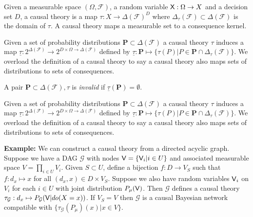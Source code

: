 \begin{definition}\label{def:gen_causal_theory}
Given a measurable space $(\Omega,\mathcal{F})$, a random variable $\mathsf{X}:\Omega\to X$ and a decision set $D$, a causal theory is a map $\tau:X \to \Delta(\mathcal{F})^D$ where $\Delta_{\tau}(\mathcal{F})\subset \Delta(\mathcal{F})$ is the domain of $\tau$. A causal theory maps a measurable set to a consequence kernel.

Given a set of probability distributions $\mathbf{P}\subset \Delta(\mathcal{F})$ a causal theory $\tau$ induces a map $\underline{\tau}:2^{\Delta(\mathcal{F})}\to 2^{D\times \Omega \to \Delta(\mathcal{F})}$ defined by $\underline{\tau}:\mathbf{P}\mapsto \{\tau(P)|P\in\mathbf{P}\cap \Delta_{\tau}(\mathcal{F})\}$. We overload the definition of a causal theory to say a causal theory also maps sets of distributions to sets of consequences.

A pair $\mathbf{P}\subset \Delta(\mathcal{F}), \tau$ is \emph{invalid} if $\underline{\tau}(\mathbf{P})=\emptyset$.

Given a set of probability distributions $\mathbf{P}\subset \Delta(\mathcal{F})$ a causal theory $\tau$ induces a map $\underline{\tau}:2^{\Delta(\mathcal{F})}\to 2^{D\times \Omega \to \Delta(\mathcal{F})}$ defined by $\underline{\tau}:\mathbf{P}\mapsto \{\tau(P)|P\in\mathbf{P}\cap \Delta_{\tau}(\mathcal{F})\}$. We overload the definition of a causal theory to say a causal theory also maps sets of distributions to sets of consequences.

\textbf{Example:} We can construct a causal theory from a directed acyclic graph. Suppose we have a DAG $\mathcal{G}$ with nodes $\mathsf{V}=\{\mathsf{V}_i|i\in U\}$ and associated measurable space $V=\prod_{i\in U} V_i$. Given $S\subset U$, define a bijection $f:D\to V_S$ such that $f:d_x\mapsto x$ for all $(d_x,x)\in D\times V_S$. Suppose we also have random variables $\mathsf{V}_i$ on $V_i$ for each $i\in U$ with joint distribution $P_\mu(\mathsf{V})$. Then $\mathcal{G}$ defines a causal theory $\tau_{\mathcal{G}}:d_x\mapsto P_{\mathcal{G}}(\mathsf{V}|do(X=x))$. If $V_S=V$ then $\mathcal{G}$ is a causal Bayesian network compatible with $\{\tau_{\mathcal{G}}(P_\mu)(x)|x\in V\}$.
\end{definition}

